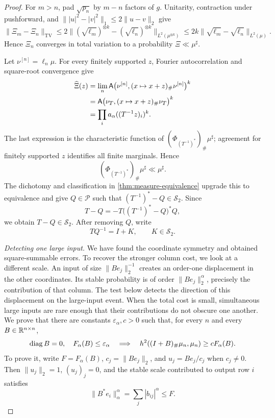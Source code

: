 \begin{proof}
For \(m>n\), pad \(\sqrt{p_n}\) by \(m-n\) factors of
\(g\).  Unitarity, contraction under pushforward, and
\(\||u|^2-|v|^2\|_1\le2\|u-v\|_2\) give
\[
 \|\Xi_m-\Xi_n\|_{\mathrm{TV}}
 \le2\|(\sqrt{\ell_m})^{\otimes k}
           -(\sqrt{\ell_n})^{\otimes k}\|_{L^2(\mu^{\otimes k})}
 \le2k\|\sqrt{\ell_m}
           -\sqrt{\ell_n}\|_{L^2(\mu)}.
\]
Hence \(\Xi_n\) converges in total variation to a probability
\(\Xi\ll\mu^\sharp\).

Let \(\nu^{[n]}=\ell_n\mu\).  For every finitely
supported \(z\), Fourier autocorrelation and square-root convergence give
\begin{align*}
 \widehat\Xi(z)
 &=\lim_n\mathsf A\bigl(\nu^{[n]},
             (x\mapsto x+z)_\#\nu^{[n]}\bigr)^k\\
 &=\mathsf A\bigl(\nu_{T},
        (x\mapsto x+z)_\#\nu_{T}\bigr)^k\\
 &=\prod_i a_\alpha((T^{-1}z)_i)^k.
\end{align*}
The last expression is the characteristic function of
\((\Phi_{(T^{-1})^*})_\#\mu^\sharp\); agreement for finitely supported \(z\)
identifies all finite marginals.  Hence
\begin{equation}
 (\Phi_{(T^{-1})^*})_\#\mu^\sharp\ll\mu^\sharp.
\end{equation}
The dichotomy and classification in \cref{thm:measure-equivalence} upgrade
this to equivalence and give
\(Q\in\mathcal P\) such that
\((T^{-1})^*-Q\in\mathcal S_2\).
Since
\[
 T-Q=-T\bigl((T^{-1})^*-Q\bigr)^*Q,
\]
we obtain \(T-Q\in\mathcal S_2\).
After removing \(Q\), write
\begin{equation}
 TQ^{-1}=I+K,
 \qquad K\in\mathcal S_2.
 \label{eq:stable-hilbert-schmidt-match}
\end{equation}

\emph{Detecting one large input.}
We have found the coordinate symmetry and obtained square-summable errors.
To recover the stronger column cost, we look at a different scale. An input
of size \(\|Be_j\|_2^{-1}\) creates an order-one displacement in the other
coordinates. Its stable probability is of order \(\|Be_j\|_2^\alpha\),
precisely the contribution of that column. The test below detects the
direction of this displacement on the large-input event. When the total
cost is small, simultaneous large inputs are rare enough that their
contributions do not obscure one another.
We prove that there are constants \(\varepsilon_\alpha,c>0\) such that,
for every \(n\) and every \(B\in\mathbb R^{n\times n}\),
\begin{equation}
 \operatorname{diag} B=0,\quad F_\alpha(B)\le\varepsilon_\alpha
 \quad\Longrightarrow\quad
 h^2((I+B)_\#\mu_n,\mu_n)
 \ge c F_\alpha(B).
 \label{eq:stable-off-diagonal-column-lower-bound}
\end{equation}
To prove it, write \(F=F_\alpha(B)\),
\(c_j=\|Be_j\|_2\), and
\(u_j=Be_j/c_j\) when \(c_j\ne0\).
Then \(\|u_j\|_2=1\), \((u_j)_j=0\), and the stable scale contributed to
output row \(i\) satisfies
\begin{equation}
 \|B^*e_i\|_\alpha^\alpha=\sum_j|b_{ij}|^\alpha\le F.
 \label{eq:stable-row-scale-bound}
\end{equation}


\end{proof}
